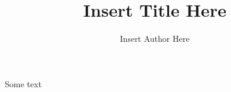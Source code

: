 \documentclass{scrartcl}
\title{Insert Title Here}
\author{Insert Author Here}
\date{}
\begin{document}
\maketitle

Some text
\end{document}
